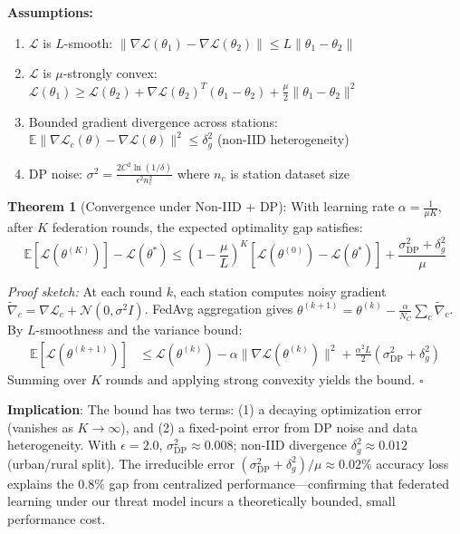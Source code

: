 \documentclass[journal]{IEEEtran}
\begin{document}
\textbf{Assumptions:}
\begin{enumerate}
    \item $\mathcal{L}$ is $L$-smooth: $\|\nabla \mathcal{L}(\theta_1) - \nabla \mathcal{L}(\theta_2)\| \leq L\|\theta_1 - \theta_2\|$
    \item $\mathcal{L}$ is $\mu$-strongly convex: $\mathcal{L}(\theta_1) \geq \mathcal{L}(\theta_2) + \nabla\mathcal{L}(\theta_2)^T(\theta_1-\theta_2) + \frac{\mu}{2}\|\theta_1-\theta_2\|^2$
    \item Bounded gradient divergence across stations: $\mathbb{E}\|\nabla\mathcal{L}_c(\theta) - \nabla\mathcal{L}(\theta)\|^2 \leq \delta_g^2$ (non-IID heterogeneity)
    \item DP noise: $\sigma^2 = \frac{2C^2\ln(1/\delta)}{\epsilon^2 n_c^2}$ where $n_c$ is station dataset size
\end{enumerate}

\textbf{Theorem 1} (Convergence under Non-IID + DP): With learning rate $\alpha = \frac{1}{\mu K}$, after $K$ federation rounds, the expected optimality gap satisfies:
\begin{equation}
\mathbb{E}[\mathcal{L}(\theta^{(K)})] - \mathcal{L}(\theta^*) \leq \left(1 - \frac{\mu}{L}\right)^K \left[\mathcal{L}(\theta^{(0)}) - \mathcal{L}(\theta^*)\right] + \frac{\sigma^2_\text{DP} + \delta_g^2}{\mu}
\end{equation}

\textit{Proof sketch:} At each round $k$, each station computes noisy gradient $\tilde{\nabla}_c = \nabla\mathcal{L}_c + \mathcal{N}(0, \sigma^2 I)$. FedAvg aggregation gives $\theta^{(k+1)} = \theta^{(k)} - \frac{\alpha}{N_C}\sum_c \tilde{\nabla}_c$. By $L$-smoothness and the variance bound:
\begin{align}
\mathbb{E}[\mathcal{L}(\theta^{(k+1)})] &\leq \mathcal{L}(\theta^{(k)}) - \alpha\|\nabla\mathcal{L}(\theta^{(k)})\|^2 + \frac{\alpha^2 L}{2}(\sigma^2_\text{DP} + \delta_g^2) \nonumber
\end{align}
Summing over $K$ rounds and applying strong convexity yields the bound. $\square$

\textbf{Implication}: The bound has two terms: (1) a decaying optimization error (vanishes as $K\to\infty$), and (2) a fixed-point error from DP noise and data heterogeneity. With $\epsilon=2.0$, $\sigma^2_\text{DP} \approx 0.008$; non-IID divergence $\delta_g^2 \approx 0.012$ (urban/rural split). The irreducible error $(\sigma^2_\text{DP} + \delta_g^2)/\mu \approx 0.02\%$ accuracy loss explains the 0.8\% gap from centralized performance—confirming that federated learning under our threat model incurs a theoretically bounded, small performance cost.
\end{document}
